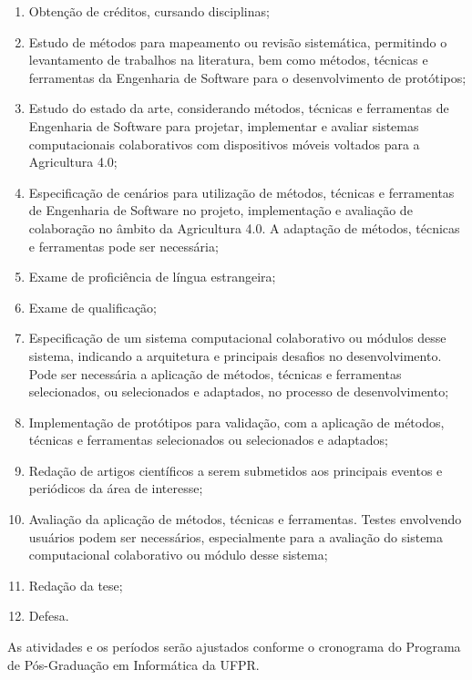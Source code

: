 \documentclass[12pt]{article}
\begin{document}
\begin{enumerate}
	\item Obtenção de créditos, cursando disciplinas;
	\item Estudo de métodos para mapeamento ou revisão sistemática, permitindo o levantamento de trabalhos na literatura, bem como métodos, técnicas e ferramentas da Engenharia de Software para o desenvolvimento de protótipos;
	\item Estudo do estado da arte, considerando métodos, técnicas e ferramentas de Engenharia de Software para projetar, implementar e avaliar sistemas computacionais colaborativos com dispositivos móveis voltados para a Agricultura 4.0;
	\item Especificação de cenários para utilização de métodos, técnicas e ferramentas de Engenharia de Software no projeto, implementação e avaliação de colaboração no âmbito da Agricultura 4.0. A adaptação de métodos, técnicas e ferramentas pode ser necessária;
	\item Exame de proficiência de língua estrangeira;
	\item Exame de qualificação;
	\item Especificação de um sistema computacional colaborativo ou módulos desse sistema, indicando a arquitetura e principais desafios no desenvolvimento. Pode ser necessária a aplicação de métodos, técnicas e ferramentas selecionados, ou selecionados e adaptados, no processo de desenvolvimento;
	\item Implementação de protótipos para validação, com a aplicação de métodos, técnicas e ferramentas selecionados ou selecionados e adaptados;
	\item Redação de artigos científicos a serem submetidos aos principais eventos e periódicos da área de interesse;
	\item Avaliação da aplicação de métodos, técnicas e ferramentas. Testes envolvendo usuários podem ser necessários, especialmente para a avaliação do sistema computacional colaborativo ou módulo desse sistema;
	\item Redação da tese;
	\item Defesa.
\end{enumerate}

As atividades e os períodos serão ajustados conforme o cronograma do Programa de Pós-Graduação em Informática da UFPR.
\end{document}
